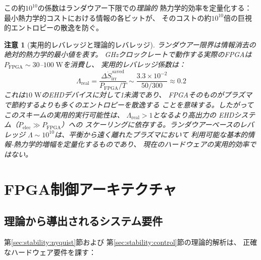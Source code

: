 \documentclass[12pt,twocolumn]{ltjsarticle}
\newtheorem{remark}{注意}
\newcommand{\Sdot}{\dot{S}_{\mathrm{irr}}}
\begin{document}
この約$10^{10}$の係数はランダウアー下限での\emph{理論的}
熱力学的効率を定量化する：最小熱力学的コストにおける情報の各ビットが、
そのコストの約$10^{10}$倍の巨視的エントロピーの散逸を防ぐ。

\begin{remark}[実用的レバレッジと理論的レバレッジ]
ランダウアー限界は情報消去の絶対的熱力学的最小値を表す。
GHzクロックレートで動作する実際のFPGAは
$P_{\mathrm{FPGA}} \sim 30$--$100\;\mathrm{W}$を消費し、
実用的レバレッジ係数は：
\begin{equation}
  \Lambda_{\mathrm{real}}
  = \frac{\Delta\Sdot^{\,\mathrm{saved}}}{P_{\mathrm{FPGA}}/T}
  \sim \frac{3.3 \times 10^{-2}}{50/300}
  \approx 0.2
  \label{eq:leverage_real}
\end{equation}
これは$10\;\mathrm{W}$のEHDデバイスに対して1未満であり、
FPGAそのものがプラズマで節約するよりも多くのエントロピーを散逸する
ことを意味する。したがってこのスキームの実用的実行可能性は、
$\Lambda_{\mathrm{real}} > 1$となるより高出力の
EHDシステム（$P_{\mathrm{elec}} \gg P_{\mathrm{FPGA}}$）への
スケーリングに依存する。ランダウアーベースのレバレッジ
$\Lambda \sim 10^{10}$は、平衡から遠く離れたプラズマにおいて
利用可能な\emph{基本的}情報-熱力学的増幅を定量化するものであり、
現在のハードウェアの実用的効率ではない。
\end{remark}

\section{FPGA制御アーキテクチャ}
\label{sec:fpga}

\subsection{理論から導出されるシステム要件}

第\ref{sec:stability:nyquist}節および
第\ref{sec:stability:control}節の理論的解析は、
正確なハードウェア要件を課す：
\end{document}
